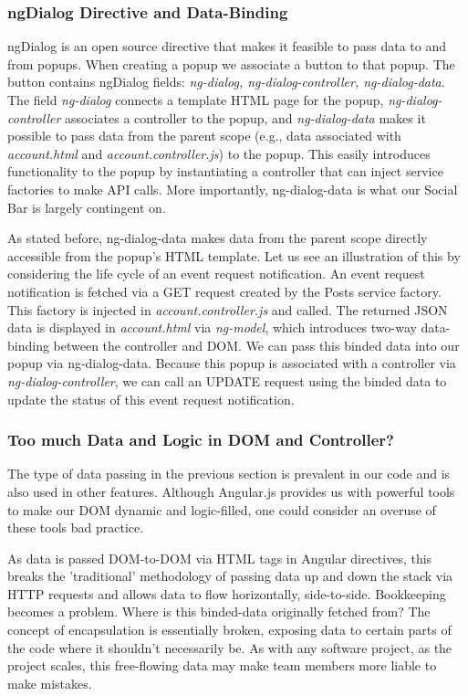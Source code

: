 \documentclass[a4paper]{article}
\begin{document}
\subsubsection{ngDialog Directive and Data-Binding}
ngDialog is an open source directive that makes it feasible to pass data to and from popups. When creating a popup we associate a button to that popup. The button contains ngDialog fields: \textit{ng-dialog, ng-dialog-controller, ng-dialog-data}. The field \textit{ng-dialog} connects a template HTML page for the popup, \textit{ng-dialog-controller} associates a controller to the popup, and \textit{ng-dialog-data} makes it possible to pass data from the parent scope (e.g., data associated with \textit{account.html} and \textit{account.controller.js}) to the popup. This easily introduces functionality to the popup by instantiating a controller that can inject service factories to make API calls. More importantly, ng-dialog-data is what our Social Bar is largely contingent on.

As stated before, ng-dialog-data makes data from the parent scope directly accessible from the popup's HTML template. Let us see an illustration of this by considering the life cycle of an event request notification. An event request notification is fetched via a GET request created by the Posts service factory. This factory is injected in \textit{account.controller.js} and called. The returned JSON data is displayed in \textit{account.html} via \textit{ng-model}, which introduces two-way data-binding between the controller and DOM. We can pass this binded data into our popup via ng-dialog-data. Because this popup is associated with a controller via \textit{ng-dialog-controller}, we can call an UPDATE request using the binded data to update the status of this event request notification.

\subsubsection{Too much Data and Logic in DOM and Controller?}

The type of data passing in the previous section is prevalent in our code and is also used in other features. Although Angular.js provides us with powerful tools to make our DOM dynamic and logic-filled, one could consider an overuse of these tools bad practice.

As data is passed DOM-to-DOM via HTML tags in Angular directives, this breaks the 'traditional' methodology of passing data up and down the stack via HTTP requests and allows data to flow horizontally, side-to-side. Bookkeeping becomes a problem. Where is this binded-data originally fetched from? The concept of encapsulation is essentially broken, exposing data to certain parts of the code where it shouldn't necessarily be. As with any software project, as the project scales, this free-flowing data may make team members more liable to make mistakes.
\end{document}
